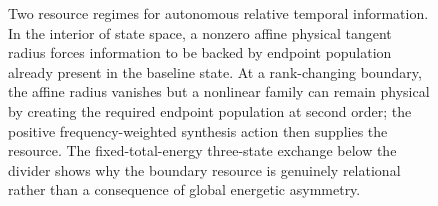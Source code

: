 \begin{figure}[t]
\centering
\setlength{\fboxsep}{10pt}
\caption{Two resource regimes for autonomous relative temporal information. In the interior of state space, a nonzero affine physical tangent radius forces information to be backed by endpoint population already present in the baseline state. At a rank-changing boundary, the affine radius vanishes but a nonlinear family can remain physical by creating the required endpoint population at second order; the positive frequency-weighted synthesis action then supplies the resource. The fixed-total-energy three-state exchange below the divider shows why the boundary resource is genuinely relational rather than a consequence of global energetic asymmetry.}
\label{fig:two-regime}
\end{figure}

